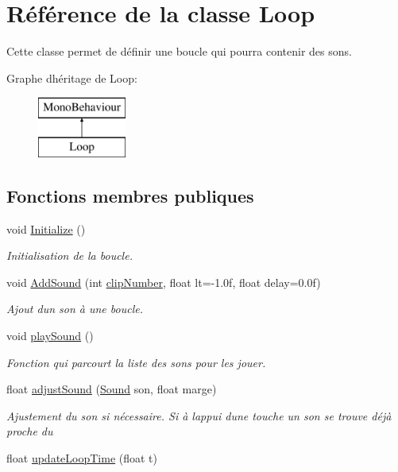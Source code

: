 \hypertarget{class_loop}{}\section{Référence de la classe Loop}
\label{class_loop}


Cette classe permet de définir une boucle qui pourra contenir des sons.  


Graphe d\textquotesingle{}héritage de Loop\+:\begin{figure}[H]
\begin{center}
\leavevmode
\includegraphics[height=2.000000cm]{class_loop}
\end{center}
\end{figure}
\subsection*{Fonctions membres publiques}
\begin{DoxyCompactItemize}
\item 
void \hyperlink{class_loop_a99c70fc61bce58f6cef6e5602cede3a6}{Initialize} ()
\begin{DoxyCompactList}\small\item\em Initialisation de la boucle. \end{DoxyCompactList}\item 
void \hyperlink{class_loop_aa45c2a57eb46812a99464c55073f3f59}{Add\+Sound} (int \hyperlink{class_loop_a00a7cf02a16a43e61c62856cd5d6b014}{clip\+Number}, float lt=-\/1.\+0f, float delay=0.\+0f)
\begin{DoxyCompactList}\small\item\em Ajout d\textquotesingle{}un son à une boucle. \end{DoxyCompactList}\item 
void \hyperlink{class_loop_a3a228a27bd11fd29c62845024654e68b}{play\+Sound} ()
\begin{DoxyCompactList}\small\item\em Fonction qui parcourt la liste des sons pour les jouer. \end{DoxyCompactList}\item 
float \hyperlink{class_loop_a9c71ffe3425e8cdf0da28f49e19af787}{adjust\+Sound} (\hyperlink{class_sound}{Sound} son, float marge)
\begin{DoxyCompactList}\small\item\em Ajustement du son si nécessaire. Si à l\textquotesingle{}appui d\textquotesingle{}une touche un son se trouve déjà proche du \end{DoxyCompactList}\item 
float \hyperlink{class_loop_ab8cef4905a0b7773933984f5f464c42d}{update\+Loop\+Time} (float t)
\end{DoxyCompactItemize}
